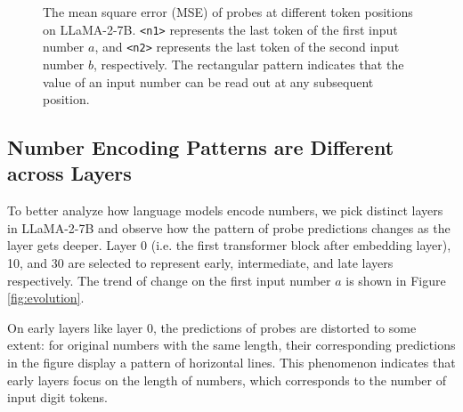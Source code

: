 \documentclass[11pt]{article}
\begin{document}
\begin{figure}[ht]
    \centering
    \caption{The mean square error (MSE) of probes at different token positions on LLaMA-2-7B. \texttt{<n1>} represents the last token of the first input number $a$, and \texttt{<n2>} represents the last token of the second input number $b$, respectively. The rectangular pattern indicates that the value of an input number can be read out at any subsequent position.}
    \label{fig:persistence}
\end{figure}

\subsection{Number Encoding Patterns are Different across Layers}
To better analyze how language models encode numbers, we pick distinct layers in LLaMA-2-7B and observe how the pattern of probe predictions changes as the layer gets deeper.
Layer 0 (i.e. the first transformer block after embedding layer), 10, and 30 are selected to represent early, intermediate, and late layers respectively.
The trend of change on the first input number $a$ is shown in Figure \ref{fig:evolution}.

On early layers like layer 0, the predictions of probes are distorted to some extent:
for original numbers with the same length, their corresponding predictions in the figure display a pattern of horizontal lines.
This phenomenon indicates that early layers focus on the length of numbers, which corresponds to the number of input digit tokens.
\end{document}
